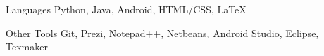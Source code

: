 


\begin{cvskills}


\cvskill
{Languages} %
{Python, Java, Android, HTML/CSS, LaTeX}





\cvskill
{Other Tools} %
{Git, Prezi, Notepad++, Netbeans, Android Studio, Eclipse, Texmaker } %






\end{cvskills}